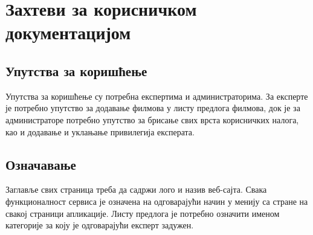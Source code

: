 \section{Захтеви за корисничком документацијом}

\subsection{Упутства за коришћење}

Упутства за коришћење су потребна експертима и администраторима. За експерте је потребно
упутство за додавање филмова у листу предлога филмова, док је за администраторе потребно
упутство за брисање свих врста корисничких налога, као и додавање и уклањање привилегија
експерата.

\subsection{Означавање}

Заглавље свих страница треба да садржи лого и назив веб-сајта. Свака функционалност
сервиса је означена на одговарајући начин у менију са стране на свакој страници апликације.
Листу предлога је потребно означити именом категорије за коју је одговарајући експерт
задужен.
